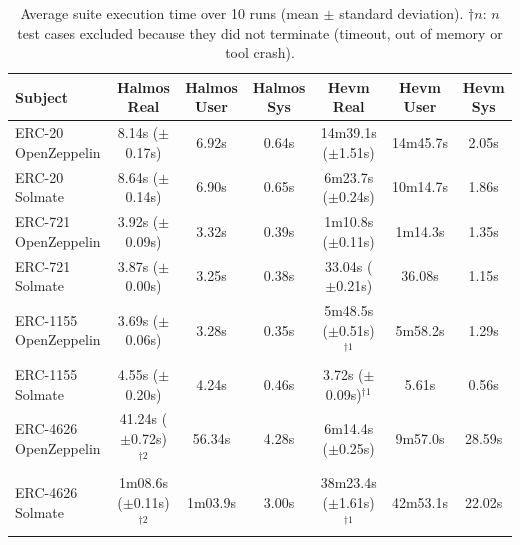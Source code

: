 \begin{table}[htb]
\centering
\begin{scriptsize}
\begin{tabular}{lcccccc}
\toprule
\textbf{Subject} & \textbf{Halmos Real} & \textbf{Halmos User} & \textbf{Halmos Sys} & \textbf{Hevm Real} & \textbf{Hevm User} & \textbf{Hevm Sys} \\
\midrule
ERC-20 OpenZeppelin & 8.14s ($\pm$0.17s) & 6.92s & 0.64s & 14m39.1s ($\pm$1.51s) & 14m45.7s & 2.05s \\
ERC-20 Solmate & 8.64s ($\pm$0.14s) & 6.90s & 0.65s & 6m23.7s ($\pm$0.24s) & 10m14.7s & 1.86s \\
ERC-721 OpenZeppelin & 3.92s ($\pm$0.09s) & 3.32s & 0.39s & 1m10.8s ($\pm$0.11s) & 1m14.3s & 1.35s \\
ERC-721 Solmate & 3.87s ($\pm$0.00s) & 3.25s & 0.38s & 33.04s ($\pm$0.21s) & 36.08s & 1.15s \\
ERC-1155 OpenZeppelin & 3.69s ($\pm$0.06s) & 3.28s & 0.35s & 5m48.5s ($\pm$0.51s)$^{\dagger1}$ & 5m58.2s & 1.29s \\
ERC-1155 Solmate & 4.55s ($\pm$0.20s) & 4.24s & 0.46s & 3.72s ($\pm$0.09s)$^{\dagger1}$ & 5.61s & 0.56s \\
ERC-4626 OpenZeppelin & 41.24s ($\pm$0.72s)$^{\dagger2}$ & 56.34s & 4.28s & 6m14.4s ($\pm$0.25s) & 9m57.0s & 28.59s \\
ERC-4626 Solmate & 1m08.6s ($\pm$0.11s)$^{\dagger2}$ & 1m03.9s & 3.00s & 38m23.4s ($\pm$1.61s)$^{\dagger1}$ & 42m53.1s & 22.02s \\
\bottomrule
\end{tabular}
\end{scriptsize}
\caption{Average suite execution time over 10 runs (mean $\pm$ standard deviation). $\dagger n$: $n$ test cases excluded because they did not terminate (timeout, out of memory or tool crash).}
\label{tab:time_all}
\end{table}
